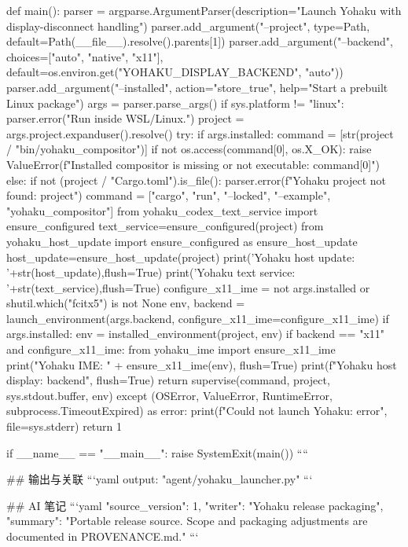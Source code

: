 def main():
    parser = argparse.ArgumentParser(description="Launch Yohaku with display-disconnect handling")
    parser.add_argument("--project", type=Path, default=Path(__file__).resolve().parents[1])
    parser.add_argument("--backend", choices=["auto", "native", "x11"], default=os.environ.get("YOHAKU_DISPLAY_BACKEND", "auto"))
    parser.add_argument("--installed", action="store_true", help="Start a prebuilt Linux package")
    args = parser.parse_args()
    if sys.platform != "linux": parser.error("Run inside WSL/Linux.")
    project = args.project.expanduser().resolve()
    try:
        if args.installed:
            command = [str(project / "bin/yohaku_compositor")]
            if not os.access(command[0], os.X_OK):
                raise ValueError(f"Installed compositor is missing or not executable: {command[0]}")
        else:
            if not (project / "Cargo.toml").is_file():
                parser.error(f"Yohaku project not found: {project}")
            command = ["cargo", "run", "--locked", "--example", "yohaku_compositor"]
            from yohaku_codex_text_service import ensure_configured
            text_service=ensure_configured(project)
            from yohaku_host_update import ensure_configured as ensure_host_update
            host_update=ensure_host_update(project)
            print('Yohaku host update: '+str(host_update),flush=True)
            print('Yohaku text service: '+str(text_service),flush=True)
        configure_x11_ime = not args.installed or shutil.which("fcitx5") is not None
        env, backend = launch_environment(args.backend, configure_x11_ime=configure_x11_ime)
        if args.installed:
            env = installed_environment(project, env)
        if backend == "x11" and configure_x11_ime:
            from yohaku_ime import ensure_x11_ime
            print("Yohaku IME: " + ensure_x11_ime(env), flush=True)
        print(f"Yohaku host display: {backend}", flush=True)
        return supervise(command, project, sys.stdout.buffer, env)
    except (OSError, ValueError, RuntimeError, subprocess.TimeoutExpired) as error:
        print(f"Could not launch Yohaku: {error}", file=sys.stderr)
        return 1


if __name__ == "__main__":
    raise SystemExit(main())
````

## 输出与关联
```yaml
output: "agent/yohaku_launcher.py"
```

## AI 笔记
```yaml
{"source_version": 1, "writer": "Yohaku release packaging", "summary": "Portable release source. Scope and packaging adjustments are documented in PROVENANCE.md."}
```
